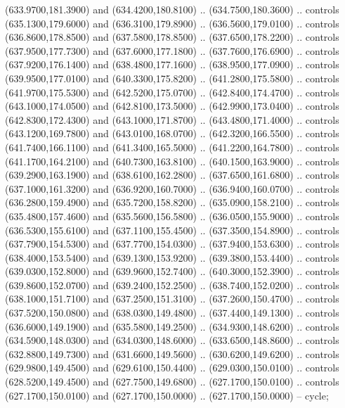 {\begin{scope}[y=0.80pt, x=0.80pt, yscale=-1, xscale=1, inner sep=0pt, outer sep=0pt, #1]
      (633.9700,181.3900) and (634.4200,180.8100) .. (634.7500,180.3600) .. controls
      (635.1300,179.6000) and (636.3100,179.8900) .. (636.5600,179.0100) .. controls
      (636.8600,178.8500) and (637.5800,178.8500) .. (637.6500,178.2200) .. controls
      (637.9500,177.7300) and (637.6000,177.1800) .. (637.7600,176.6900) .. controls
      (637.9200,176.1400) and (638.4800,177.1600) .. (638.9500,177.0900) .. controls
      (639.9500,177.0100) and (640.3300,175.8200) .. (641.2800,175.5800) .. controls
      (641.9700,175.5300) and (642.5200,175.0700) .. (642.8400,174.4700) .. controls
      (643.1000,174.0500) and (642.8100,173.5000) .. (642.9900,173.0400) .. controls
      (642.8300,172.4300) and (643.1000,171.8700) .. (643.4800,171.4000) .. controls
      (643.1200,169.7800) and (643.0100,168.0700) .. (642.3200,166.5500) .. controls
      (641.7400,166.1100) and (641.3400,165.5000) .. (641.2200,164.7800) .. controls
      (641.1700,164.2100) and (640.7300,163.8100) .. (640.1500,163.9000) .. controls
      (639.2900,163.1900) and (638.6100,162.2800) .. (637.6500,161.6800) .. controls
      (637.1000,161.3200) and (636.9200,160.7000) .. (636.9400,160.0700) .. controls
      (636.2800,159.4900) and (635.7200,158.8200) .. (635.0900,158.2100) .. controls
      (635.4800,157.4600) and (635.5600,156.5800) .. (636.0500,155.9000) .. controls
      (636.5300,155.6100) and (637.1100,155.4500) .. (637.3500,154.8900) .. controls
      (637.7900,154.5300) and (637.7700,154.0300) .. (637.9400,153.6300) .. controls
      (638.4000,153.5400) and (639.1300,153.9200) .. (639.3800,153.4400) .. controls
      (639.0300,152.8000) and (639.9600,152.7400) .. (640.3000,152.3900) .. controls
      (639.8600,152.0700) and (639.2400,152.2500) .. (638.7400,152.0200) .. controls
      (638.1000,151.7100) and (637.2500,151.3100) .. (637.2600,150.4700) .. controls
      (637.5200,150.0800) and (638.0300,149.4800) .. (637.4400,149.1300) .. controls
      (636.6000,149.1900) and (635.5800,149.2500) .. (634.9300,148.6200) .. controls
      (634.5900,148.0300) and (634.0300,148.6000) .. (633.6500,148.8600) .. controls
      (632.8800,149.7300) and (631.6600,149.5600) .. (630.6200,149.6200) .. controls
      (629.9800,149.4500) and (629.6100,150.4400) .. (629.0300,150.0100) .. controls
      (628.5200,149.4500) and (627.7500,149.6800) .. (627.1700,150.0100) .. controls
      (627.1700,150.0100) and (627.1700,150.0000) .. (627.1700,150.0000) -- cycle;


\end{scope}}
